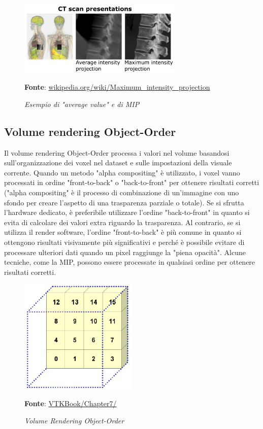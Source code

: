 \begin{figure}[h]
    \centering
    \includegraphics[width=0.7\textwidth]{immagini/volumerendering/mip.jpg}
    \caption{\textit{Esempio di "average value" e di MIP}}
    \textbf{Fonte}: \href{https://en.wikipedia.org/wiki/Maximum_intensity_projection}{wikipedia.org/wiki/Maximum\_intensity\_projection}
    \label{fig: Volume Rendering Example}
\end{figure}

\subsection{Volume rendering Object-Order}\label{sec:volume-object-order}
Il volume rendering Object-Order processa i valori nel volume basandosi sull'organizzazione dei voxel nel dataset e sulle impostazioni della visuale corrente. Quando un metodo "alpha compositing" è utilizzato, i voxel vanno processati in ordine "front-to-back" o "back-to-front" per ottenere risultati corretti ("alpha compositing" è il processo di combinazione di un'immagine con uno sfondo per creare l'aspetto di una trasparenza parziale o totale). Se si sfrutta l'hardware dedicato, è preferibile utilizzare l'ordine "back-to-front" in quanto si evita di calcolare dei valori extra riguardo la trasparenza. Al contrario, se si utilizza il render software, l'ordine "front-to-back" è più comune in quanto si ottengono risultati visivamente più significativi e perché è possibile evitare di processare ulteriori dati quando un pixel raggiunge la "piena opacità". Alcune tecniche, come la MIP, possono essere processate in qualsiasi ordine per ottenere risultati corretti.

\begin{figure}[h]
    \centering
    \includegraphics[width=0.5\textwidth]{immagini/volumerendering/objectorder.png}
    \caption{\textit{Volume Rendering Object-Order}}
    \textbf{Fonte}: \href{https://lorensen.github.io/VTKExamples/site/VTKBook/07Chapter7/}{VTKBook/Chapter7/}
    \label{fig: Volume Rendering Object-Order}
\end{figure}

